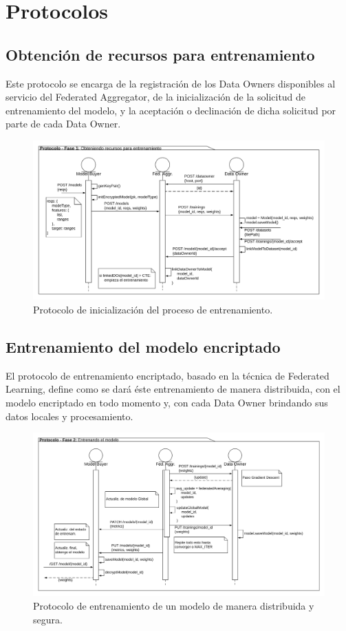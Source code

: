 \documentclass[
11pt, %
oneside, %
spanish, %
singlespacing, %
parskip, %
headsepline, %
chapterinoneline, %
]{MastersDoctoralThesis} %
\begin{document}
\section{Protocolos}

\subsection*{Obtención de recursos para entrenamiento}

Este protocolo se encarga  de la registración de los Data Owners disponibles al servicio del Federated Aggregator, de la inicialización de la solicitud de entrenamiento del modelo, y la aceptación o declinación de dicha solicitud por parte de cada Data Owner. 

\begin{figure}[H]
  	\centering
	\includegraphics[scale=0.1]{imgs/flujo_fase1.png}
	\caption{Protocolo de inicialización del proceso de entrenamiento.}
\end{figure}

\subsection*{Entrenamiento del modelo encriptado}

El protocolo de entrenamiento encriptado, basado en la técnica de Federated Learning, define como se dará éste entrenamiento de manera distribuida, con el modelo encriptado en todo momento y, con cada Data Owner brindando sus datos locales y procesamiento.

\begin{figure}[H]
  	\centering
	\includegraphics[scale=0.1]{imgs/flujo_fase2.png}
	\caption{Protocolo de entrenamiento de un modelo de manera distribuida y segura.}
\end{figure}
\end{document}
